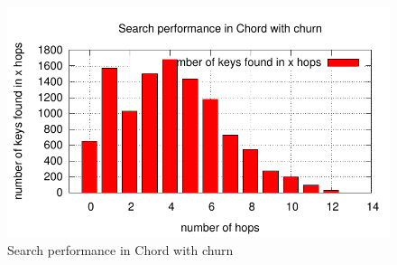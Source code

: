 \documentclass[a4paper, 11pt]{article}
\theoremstyle{plain}
\theoremstyle{definition}
\begin{document}
    \begin{figure}[h]
      \centering
      \includegraphics{plots/task3-5-cluster.pdf}
      \caption{Search performance in Chord with churn}
      \label{fig:search-perf-with-churn}
    \end{figure}



    
    
    












	
\end{document}
